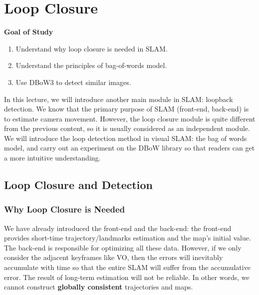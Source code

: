\chapter{Loop Closure}
\begin{mdframed}  
	\textbf{Goal of Study}
	\begin{enumerate}[labelindent=0em,leftmargin=1.5em]
		\item Understand why loop closure is needed in SLAM.
		\item Understand the principles of bag-of-words model. 
		\item Use DBoW3 to detect similar images. 
	\end{enumerate}
\end{mdframed}

In this lecture, we will introduce another main module in SLAM: loopback detection. We know that the primary purpose of SLAM (front-end, back-end) is to estimate camera movement. However, the loop closure module is quite different from the previous content, so it is usually considered as an independent module. We will introduce the loop detection method in visual SLAM: the bag of words model, and carry out an experiment on the DBoW library so that readers can get a more intuitive understanding.
\newpage


\newpage
\section{Loop Closure and Detection}
\subsection{Why Loop Closure is Needed}
We have already introduced the front-end and the back-end: the front-end provides short-time trajectory/landmarks estimation and the map's initial value. The back-end is responsible for optimizing all these data. However, if we only consider the adjacent keyframes like VO, then the errors will inevitably accumulate with time so that the entire SLAM will suffer from the accumulative error. The result of long-term estimation will not be reliable. In other words, we cannot construct \textbf{globally consistent} trajectories and maps.


